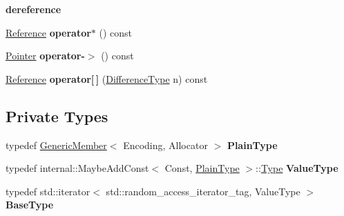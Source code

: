 \begin{Indent}{\bf dereference}\par
\begin{DoxyCompactItemize}
\item 
\hyperlink{class_generic_member_iterator_ae80f6b601eb9e24f73aa75fb32b35c65}{Reference} {\bfseries operator$\ast$} () const \hypertarget{class_generic_member_iterator_a37f5cb3b669682da70fe3e5ec6bc4775}{}\label{class_generic_member_iterator_a37f5cb3b669682da70fe3e5ec6bc4775}

\item 
\hyperlink{class_generic_member_iterator_ac69f141f1fde31c1f550f524a69c5de9}{Pointer} {\bfseries operator-\/$>$} () const \hypertarget{class_generic_member_iterator_a2e3d0e0f9a5c0ca69f09e4927ed985c3}{}\label{class_generic_member_iterator_a2e3d0e0f9a5c0ca69f09e4927ed985c3}

\item 
\hyperlink{class_generic_member_iterator_ae80f6b601eb9e24f73aa75fb32b35c65}{Reference} {\bfseries operator\mbox{[}$\,$\mbox{]}} (\hyperlink{class_generic_member_iterator_a902b99c8ae351cd7626514dc5f30740a}{Difference\+Type} n) const \hypertarget{class_generic_member_iterator_ae83095869e033554257e3f33df59fcfb}{}\label{class_generic_member_iterator_ae83095869e033554257e3f33df59fcfb}

\end{DoxyCompactItemize}
\end{Indent}
\subsection*{Private Types}
\begin{DoxyCompactItemize}
\item 
typedef \hyperlink{struct_generic_member}{Generic\+Member}$<$ Encoding, Allocator $>$ {\bfseries Plain\+Type}\hypertarget{class_generic_member_iterator_ac0d50d12ba074e68837964244668c66b}{}\label{class_generic_member_iterator_ac0d50d12ba074e68837964244668c66b}

\item 
typedef internal\+::\+Maybe\+Add\+Const$<$ Const, \hyperlink{struct_generic_member}{Plain\+Type} $>$\+::\hyperlink{rapidjson_8h_a1d1cfd8ffb84e947f82999c682b666a7}{Type} {\bfseries Value\+Type}\hypertarget{class_generic_member_iterator_a1323c9d064a9c388a1eb62a6e2c17584}{}\label{class_generic_member_iterator_a1323c9d064a9c388a1eb62a6e2c17584}

\item 
typedef std\+::iterator$<$ std\+::random\+\_\+access\+\_\+iterator\+\_\+tag, Value\+Type $>$ {\bfseries Base\+Type}\hypertarget{class_generic_member_iterator_a745942368b5c6c6cf32878ad104239a3}{}\label{class_generic_member_iterator_a745942368b5c6c6cf32878ad104239a3}

\end{DoxyCompactItemize}
